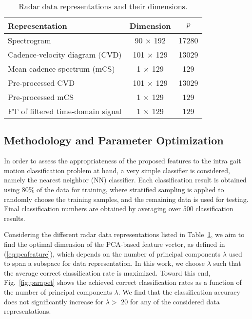 \begin{table}[!t]
	\renewcommand{\arraystretch}{1.3}
	\caption{Radar data representations and their dimensions.}
	\label{tab:inputs}
	\centering
	\begin{tabular}{l c c }
		\hline
		Representation & Dimension & $p$ \\
		\hline \hline
		Spectrogram			    					& 90 $\times$ 192 & 17280 \\
		Cadence-velocity diagram (CVD)  			& 101 $\times$ 129 & 13029 \\
		Mean cadence spectrum (mCS)					& 1 $\times$ 129 & 129 \\
		Pre-processed CVD 							& 101 $\times$ 129 & 13029\\
		Pre-processed mCS 							& 1 $\times$ 129 & 129 \\
		FT of filtered time-domain signal 			& 1 $\times$ 129 & 129 \\
		\hline
	\end{tabular}
\end{table}

\subsection{Methodology and Parameter Optimization}\label{ssec:method}
In order to assess the appropriateness of the proposed features to the intra gait motion classification problem at hand, a very simple classifier is considered, namely the nearest neighbor (NN) classifier. Each classification result is obtained using 80\% of the data for training, where stratified sampling is applied to randomly choose the training samples, and the remaining data is used for testing. Final classification numbers are obtained by averaging over 500 classification results.

Considering the different radar data representations listed in Table~\ref{tab:inputs}, we aim to find the optimal dimension of the PCA-based feature vector, as defined in (\ref{eq:pcafeature}), which depends on the number of principal components $\lambda$ used to span a subspace for data representation. In this work, we choose $\lambda$ such that the average correct classification rate is maximized. Toward this end, Fig.~\ref{fig:parapet} shows the achieved correct classification rates as a function of the number of principal components $\lambda$. We find that the classification accuracy does not significantly increase for $\lambda >$ 20 for any of the considered data representations.

